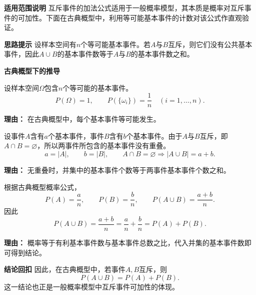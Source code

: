 \begin{proofbox}
\textbf{\textcolor{CProof}{适用范围说明}}
互斥事件的加法公式适用于一般概率模型，其本质是概率对互斥事件的可加性。下面在古典概型中，利用等可能基本事件的计数对该公式作直观验证。

\medskip
\textbf{\textcolor{CProof}{思路提示}}
设样本空间有$n$个等可能基本事件。若$A$与$B$互斥，则它们没有公共基本事件，因此$A\cup B$的基本事件数等于$A$与$B$的基本事件数之和。

\medskip
\textbf{\textcolor{CProof}{古典概型下的推导}}
\begin{description}[style=nextline, leftmargin=2.8em, labelsep=0.5em, itemsep=0.55em]
    \item[\textbf{步骤一（设定样本空间）：}]
    设样本空间$\Omega$包含$n$个等可能的基本事件。
    \[
        P(\Omega)=1,\qquad
        P(\{\omega_i\})=\frac{1}{n}
        \quad (i=1,\ldots,n).
    \]
    \par\textbf{理由：}
    在古典概型中，每个基本事件等可能发生。

    \item[\textbf{步骤二（基本事件计数）：}]
    设事件$A$含有$a$个基本事件，事件$B$含有$b$个基本事件。由于$A$与$B$互斥，即$A\cap B=\varnothing$，所以两事件所包含的基本事件没有重叠。
    \[
        a=|A|,\qquad
        b=|B|,\qquad
        A\cap B=\varnothing
        \Rightarrow
        |A\cup B|=a+b.
    \]
    \par\textbf{理由：}
    无重叠时，并集中的基本事件个数等于两事件基本事件个数之和。

    \item[\textbf{步骤三（计算概率）：}]
    根据古典概型概率公式，
    \[
        P(A)=\frac{a}{n},\qquad
        P(B)=\frac{b}{n},\qquad
        P(A\cup B)=\frac{a+b}{n}.
    \]
    因此
    \[
        P(A\cup B)
        =
        \frac{a+b}{n}
        =
        \frac{a}{n}+\frac{b}{n}
        =
        P(A)+P(B).
    \]
    \par\textbf{理由：}
    概率等于有利基本事件数与基本事件总数之比，代入并集的基本事件数即可得到结论。
\end{description}

\medskip
\textbf{\textcolor{CProof}{结论回扣}}
因此，在古典概型中，若事件$A,B$互斥，则
\[
    P(A\cup B)=P(A)+P(B).
\]
这一结论也正是一般概率模型中互斥事件可加性的体现。
\end{proofbox}
